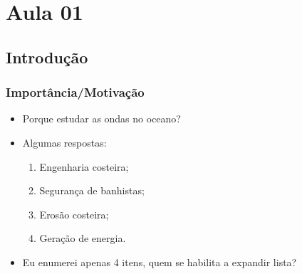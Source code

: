\section{Aula 01}
\subsection{Introdução}
{%
\begin{frame}
    \frametitle{Importância/Motivação}
    \begin{itemize}[<+-| alert@+>]
        \item Porque estudar as ondas no oceano?
        \item Algumas respostas:
            \begin{enumerate}[<+-| alert@+>]
                \item[] Engenharia costeira;
                \item[] Segurança de banhistas;
                \item[] Erosão costeira;
                \item[] Geração de energia.
            \end{enumerate}
        \item Eu enumerei apenas 4 itens, quem se habilita a expandir lista?
    \end{itemize}
    \vspace*{5cm}
\end{frame}
}

